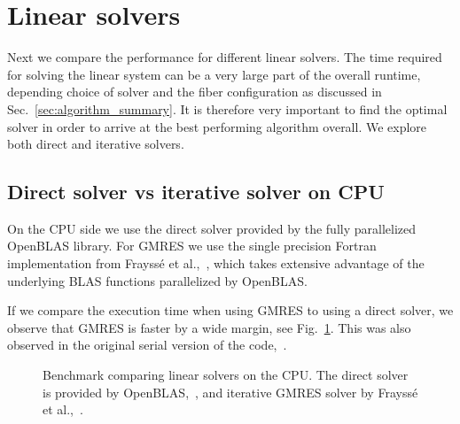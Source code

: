 \section{Linear solvers}
\label{sec:bench_linear_solvers}

Next we compare the performance for different linear solvers. The time required for solving the linear system can be a very large part of the overall runtime, depending choice of solver and the fiber configuration as discussed in Sec.~\ref{sec:algorithm_summary}. It is therefore very important to find the optimal solver in order to arrive at the best performing algorithm overall. We explore both direct and iterative solvers.

\subsection{Direct solver vs iterative solver on CPU}
On the CPU side we use the direct solver provided by the fully parallelized OpenBLAS library. For GMRES we use the single precision Fortran implementation from Frayssé et al.,~\cite{Fraysse2003}, which takes extensive advantage of the underlying BLAS functions parallelized by OpenBLAS. 

If we compare the execution time when using GMRES to using a direct solver, we observe that GMRES is faster by a wide margin, see Fig.~\ref{fig:bench_openmp_solvers}. This was also observed in the original serial version of the code,~\cite{Tornberg2006}.

\begin{figure}[htbp]
  \centering
  \caption[Benchmark linear solvers on CPU.]{Benchmark comparing linear solvers on the CPU. The direct solver is provided by OpenBLAS,~\cite{OpenBLAS}, and iterative GMRES solver by Frayssé et al.,~\cite{Fraysse2003}.}
  \label{fig:bench_openmp_solvers}
\end{figure}

